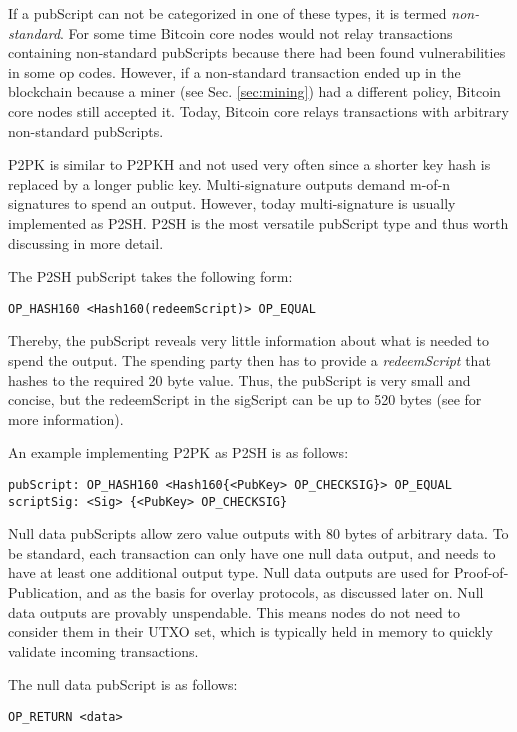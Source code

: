 If a pubScript can not be categorized in one of these types, it is termed \emph{non-standard}. For some time Bitcoin core nodes would not relay transactions containing non-standard pubScripts because there had been found vulnerabilities in some op codes. However, if a non-standard transaction ended up in the blockchain because a miner  (see Sec. \ref{sec:mining}) had a different policy, Bitcoin core nodes still accepted it. Today, Bitcoin core relays transactions with arbitrary non-standard pubScripts.

\ac{P2PK} is similar to \ac{P2PKH} and not used very often since a shorter key hash is replaced by a longer public key. Multi-signature outputs demand m-of-n signatures to spend an output. However, today multi-signature is usually implemented as \ac{P2SH}. \ac{P2SH} is the most versatile pubScript type and thus worth discussing in more detail.

The \ac{P2SH} pubScript takes the following form:

\begin{lstlisting}
OP_HASH160 <Hash160(redeemScript)> OP_EQUAL
\end{lstlisting}

Thereby, the pubScript reveals very little information about what is needed to spend the output. The spending party then has to provide a \emph{redeemScript} that hashes to the required 20 byte value. Thus, the pubScript is very small and concise, but the redeemScript in the sigScript can be up to 520 bytes (see \parencite{bip16} for more information). 

An example implementing \ac{P2PK} as \ac{P2SH} is as follows:

\begin{lstlisting}[breaklines]
pubScript: OP_HASH160 <Hash160{<PubKey> OP_CHECKSIG}> OP_EQUAL
scriptSig: <Sig> {<PubKey> OP_CHECKSIG}
\end{lstlisting}

Null data pubScripts allow zero value outputs with 80 bytes of arbitrary data. To be standard, each transaction can only have one null data output, and needs to have at least one additional output type. Null data outputs are used for Proof-of-Publication, and as the basis for overlay protocols, as discussed later on. Null data outputs are provably unspendable. This means nodes do not need to consider them in their \ac{UTXO} set, which is typically held in memory to quickly validate incoming transactions. 

The null data pubScript is as follows:
\begin{lstlisting}
OP_RETURN <data>
\end{lstlisting}

